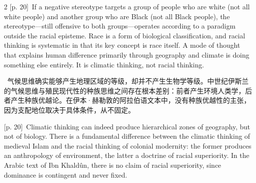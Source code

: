 \documentclass[10pt,a4paper]{article}
\begin{document}
\begin{paracol}{2}
{\scriptsize\color{gray} [p. 20]}\ If a negative stereotype targets a group of people who are white (not all white people) and another group who are Black (not all Black people), the stereotype—still offensive to both groups—operates according to a paradigm outside the racial episteme. Race is a form of biological classification, and racial thinking is systematic in that its key concept is race itself. A mode of thought that explains human difference primarily through geography and climate is doing something else entirely. It is climatic thinking, not racial thinking.\par
\switchcolumn*
{\scriptsize\color{gray} [p. 20]}\ 气候思维确实能够产生地理区域的等级，却并不产生生物学等级。中世纪伊斯兰的气候思维与殖民现代性的种族思维之间存在根本差别：前者产生环境人类学，后者产生种族优越论。在伊本·赫勒敦的阿拉伯语文本中，没有种族优越性的主张，因为支配地位取决于具体条件，从不固定。\par
\switchcolumn
{\scriptsize\color{gray} [p. 20]}\ Climatic thinking can indeed produce hierarchical zones of geography, but not of biology. There is a fundamental difference between the climatic thinking of medieval Islam and the racial thinking of colonial modernity: the former produces an anthropology of environment, the latter a doctrine of racial superiority. In the Arabic text of Ibn Khaldûn, there is no claim of racial superiority, since dominance is contingent and never fixed.\par
\switchcolumn*

\end{paracol}
\end{document}
